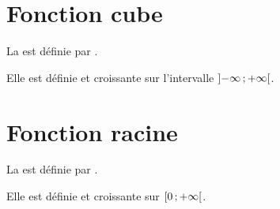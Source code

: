 \documentclass[12pt,a4paper]{article}
\begin{document}
	
	
	
	
	\section{Fonction cube}
	
	
	\begin{mybilan}
		La  est définie par .		
		
		Elle est définie et croissante sur l'intervalle $\mbox{\ensuremath{\left]- \infty \mathpunct{};+ \infty\right[}}$.	
	\end{mybilan}
	
	
	
	
	
	\section{Fonction racine}
	
	\begin{mybilan}
		La  est définie par \kw{$x \mapsto \sqrt{x}$}.			
		
		Elle est définie et croissante sur $\mbox{\ensuremath{\left[0\mathpunct{};+\infty\right[}}$.
	\end{mybilan}
	
	
	
	
	
	
	
\end{document}
